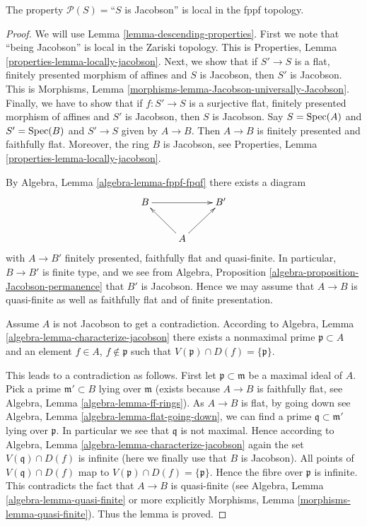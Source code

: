 \begin{lemma}
\label{lemma-Jacobson-local-fppf}
The property $\mathcal{P}(S) =$``$S$ is Jacobson'' is local
in the fppf topology.
\end{lemma}

\begin{proof}
We will use Lemma \ref{lemma-descending-properties}.
First we note that ``being Jacobson'' is local
in the Zariski topology. This is
Properties, Lemma \ref{properties-lemma-locally-jacobson}.
Next, we show that if $S' \to S$ is a flat, finitely presented
morphism of affines and $S$ is Jacobson, then $S'$ is
Jacobson. This is
Morphisms, Lemma \ref{morphisms-lemma-Jacobson-universally-Jacobson}.
Finally, we have to show that if $f : S' \to S$ is a surjective
flat, finitely presented morphism of affines and $S'$ is
Jacobson, then $S$ is Jacobson. Say $S = \mathop{\rm Spec}(A)$ and
$S' = \mathop{\rm Spec}(B)$ and $S' \to S$ given by $A \to B$.
Then $A \to B$ is finitely presented and faithfully flat.
Moreover, the ring $B$ is Jacobson, see
Properties, Lemma \ref{properties-lemma-locally-jacobson}.

\medskip\noindent
By Algebra, Lemma \ref{algebra-lemma-fppf-fpqf} there exists a diagram
$$
\xymatrix{
B \ar[rr] & & B' \\
& A \ar[ru] \ar[lu] &
}
$$
with $A \to B'$ finitely presented, faithfully flat and quasi-finite.
In particular, $B \to B'$ is finite type, and we see from
Algebra, Proposition \ref{algebra-proposition-Jacobson-permanence}
that $B'$ is Jacobson. Hence we may assume that $A \to B$ is quasi-finite
as well as faithfully flat and of finite presentation.

\medskip\noindent
Assume $A$ is not Jacobson to get a contradiction.
According to Algebra, Lemma \ref{algebra-lemma-characterize-jacobson}
there exists a nonmaximal prime $\mathfrak p \subset A$ and
an element $f \in A$, $f \not \in \mathfrak p$ such that
$V(\mathfrak p) \cap D(f) = \{\mathfrak p\}$.

\medskip\noindent
This leads to a contradiction as follows. First let
$\mathfrak p \subset \mathfrak m$ be a maximal ideal of $A$.
Pick a prime $\mathfrak m' \subset B$ lying over $\mathfrak m$
(exists because $A \to B$ is faithfully flat, see
Algebra, Lemma \ref{algebra-lemma-ff-rings}).
As $A \to B$ is flat, by going down see
Algebra, Lemma \ref{algebra-lemma-flat-going-down},
we can find a prime $\mathfrak q \subset \mathfrak m'$ lying over
$\mathfrak p$. In particular we see that $\mathfrak q$ is not
maximal. Hence according to
Algebra, Lemma \ref{algebra-lemma-characterize-jacobson} again
the set $V(\mathfrak q) \cap D(f)$ is infinite
(here we finally use that $B$ is Jacobson).
All points of $V(\mathfrak q) \cap D(f)$ map to
$V(\mathfrak p) \cap D(f) = \{\mathfrak p\}$. Hence the
fibre over $\mathfrak p$ is infinite. This contradicts the
fact that $A \to B$ is quasi-finite (see
Algebra, Lemma \ref{algebra-lemma-quasi-finite}
or more explicitly
Morphisms, Lemma \ref{morphisms-lemma-quasi-finite}).
Thus the lemma is proved.
\end{proof}





